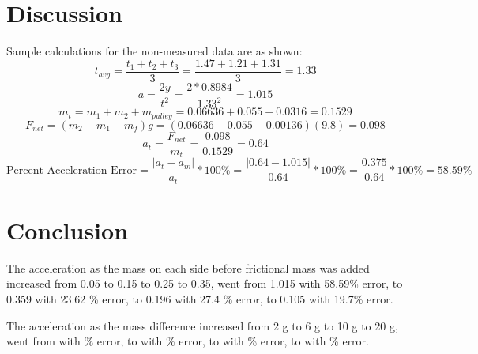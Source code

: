 \documentclass[11pt, titlepage]{article}
\begin{document}
\section*{Discussion}
Sample calculations for the non-measured data are as shown:
$$t_{avg} = \frac{t_1 + t_2 + t_3}{3} = \frac{1.47 + 1.21 + 1.31}{3} = 1.33$$
$$a = \frac{2y}{t^2} = \frac{2*0.8984}{1.33^2} = 1.015$$
$$m_t = m_1 + m_2 + m_{pulley} = 0.06636 + 0.055 + 0.0316 = 0.1529$$
$$F_{net} = (m_2 - m_1 - m_f)g = (0.06636 - 0.055 - 0.00136)(9.8) = 0.098$$
$$a_t = \frac{F_{net}}{m_t} = \frac{0.098}{0.1529} = 0.64$$
$$\text{Percent Acceleration Error} = \frac{|a_t - a_m|}{a_t}*100\% = \frac{|0.64 - 1.015|}{0.64}*100\% = \frac{0.375}{0.64}*100\% = 58.59\%$$


\section*{Conclusion}

The acceleration as the mass on each side before frictional mass was added increased from 0.05 to 0.15 to 0.25 to 0.35, went from 1.015 with 58.59\% error, to 0.359 with 23.62 \% error, to 0.196 with 27.4 \% error, to 0.105 with 19.7\% error.

The acceleration as the mass difference increased from 2 g to 6 g to 10 g to 20 g, went from with \% error, to with \% error, to with \% error, to with \% error. 
\end{document}
